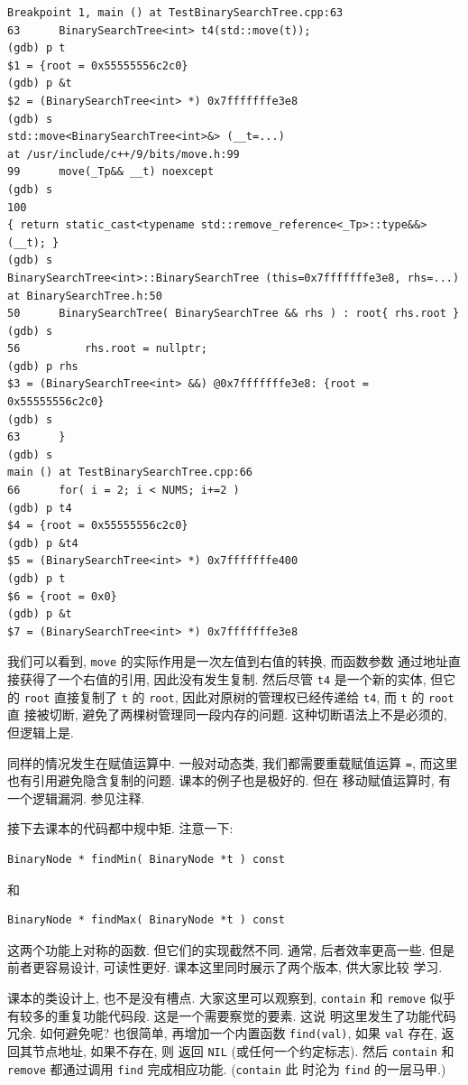 \documentclass[a4paper]{ctexart}
\theoremstyle{definition}
\theoremstyle{definition}
\begin{document}
\begin{verbatim}
Breakpoint 1, main () at TestBinarySearchTree.cpp:63
63	    BinarySearchTree<int> t4(std::move(t));
(gdb) p t
$1 = {root = 0x55555556c2c0}
(gdb) p &t
$2 = (BinarySearchTree<int> *) 0x7fffffffe3e8
(gdb) s
std::move<BinarySearchTree<int>&> (__t=...) 
at /usr/include/c++/9/bits/move.h:99
99	    move(_Tp&& __t) noexcept
(gdb) s
100	    
{ return static_cast<typename std::remove_reference<_Tp>::type&&>(__t); }
(gdb) s
BinarySearchTree<int>::BinarySearchTree (this=0x7fffffffe3e8, rhs=...) 
at BinarySearchTree.h:50
50	    BinarySearchTree( BinarySearchTree && rhs ) : root{ rhs.root }
(gdb) s
56			rhs.root = nullptr;
(gdb) p rhs
$3 = (BinarySearchTree<int> &&) @0x7fffffffe3e8: {root = 0x55555556c2c0}
(gdb) s
63	    }
(gdb) s
main () at TestBinarySearchTree.cpp:66
66	    for( i = 2; i < NUMS; i+=2 )
(gdb) p t4
$4 = {root = 0x55555556c2c0}
(gdb) p &t4
$5 = (BinarySearchTree<int> *) 0x7fffffffe400
(gdb) p t
$6 = {root = 0x0}
(gdb) p &t
$7 = (BinarySearchTree<int> *) 0x7fffffffe3e8
\end{verbatim}

我们可以看到, \verb|move| 的实际作用是一次左值到右值的转换, 而函数参数
通过地址直接获得了一个右值的引用, 因此没有发生复制. 然后尽管 \verb|t4|
是一个新的实体, 但它的 \verb|root| 直接复制了 \verb|t| 的 \verb|root|,
因此对原树的管理权已经传递给 \verb|t4|, 而 \verb|t| 的 \verb|root| 直
接被切断, 避免了两棵树管理同一段内存的问题. 这种切断语法上不是必须的,
但逻辑上是.

同样的情况发生在赋值运算中. 一般对动态类, 我们都需要重载赋值运算
\verb|=|, 而这里也有引用避免隐含复制的问题. 课本的例子也是极好的. 但在
移动赋值运算时, 有一个逻辑漏洞. 参见注释.

接下去课本的代码都中规中矩. 注意一下:
\begin{verbatim}
BinaryNode * findMin( BinaryNode *t ) const
\end{verbatim}
和
\begin{verbatim}
BinaryNode * findMax( BinaryNode *t ) const
\end{verbatim}
这两个功能上对称的函数. 但它们的实现截然不同. 通常, 后者效率更高一些.
但是前者更容易设计, 可读性更好. 课本这里同时展示了两个版本, 供大家比较
学习.

课本的类设计上, 也不是没有槽点. 大家这里可以观察到, \verb|contain| 和
\verb|remove| 似乎有较多的重复功能代码段. 这是一个需要察觉的要素. 这说
明这里发生了功能代码冗余. 如何避免呢? 也很简单, 再增加一个内置函数
\verb|find(val)|, 如果 \verb|val| 存在, 返回其节点地址, 如果不存在, 则
返回 \verb|NIL| (或任何一个约定标志). 然后 \verb|contain| 和
\verb|remove| 都通过调用 \verb|find| 完成相应功能. (\verb|contain| 此
时沦为 \verb|find| 的一层马甲.)
\end{document}
